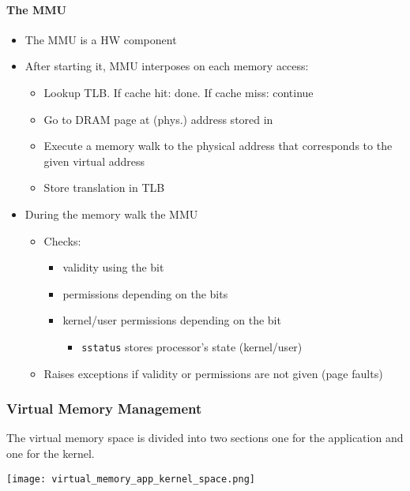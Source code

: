 \paragraph{The MMU}
\begin{itemize}
    \item The MMU is a HW component
    \item After starting it, MMU interposes on each memory access:
          \begin{itemize}
              \item Lookup TLB. If cache hit: done. If cache miss: continue
              \item Go to DRAM page at (phys.) address stored in 
              \item Execute a memory walk to the physical address that corresponds to the given virtual address
              \item Store translation in TLB
          \end{itemize}
    \item During the memory walk the MMU
          \begin{itemize}
              \item Checks:
                    \begin{itemize}
                        \item validity using the  bit
                        \item permissions depending on the  bits
                        \item kernel/user permissions depending on the  bit
                              \begin{itemize}
                                  \item \texttt{sstatus} stores processor's state (kernel/user)
                              \end{itemize}
                    \end{itemize}
              \item Raises exceptions if validity or permissions are not given (page faults)
          \end{itemize}
\end{itemize}

\subsubsection{Virtual Memory Management}
The virtual memory space is divided into two sections one for the application and one for the kernel.
\begin{center}
    \texttt{[image: virtual\_memory\_app\_kernel\_space.png]}
\end{center}

